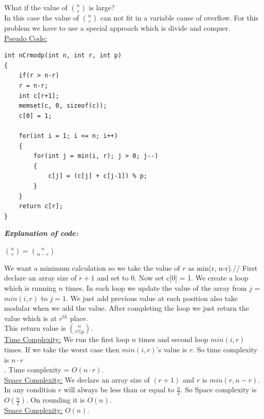 \documentclass[12pt]{book}
\begin{document}
What if the value of $n \choose r$ is large?\\

In this case the value of $n \choose r$ can not fit in a variable cause of overflow. For this problem we have to use a special approach which is divide and conquer.\\

\underline{Pseudo Code:}\\

\begin{lstlisting}
int nCrmodp(int n, int r, int p)
{
    if(r > n-r)
    r = n-r;
    int c[r+1];
    memset(c, 0, sizeof(c));
    c[0] = 1;

    for(int i = 1; i <= n; i++)
    {
        for(int j = min(i, r); j > 0; j--)
        {
            c[j] = (c[j] + c[j-1]) % p;
        }
    }
    return c[r];
}
\end{lstlisting}

\textbf{\textit{Explanation of code:}}\\
\begin{center}
$ {n \choose r} = {n \choose n - r} $\\
\end{center}

We want a minimum calculation so we take the value of $r$ as min(r, n-r).// 
First declare an array size of $r+1$ and set to 0. Now set c[0] = 1. We create a loop which is running $n$ times. In each loop we update the value of the array from $j$ = $min(i, r)$ to $j = 1$. We just add previous value at each position also take modular when we add the value. After completing the loop we just return the value which is at $r^{th}$ place.\\

This return value is $n \choose r \% p $.\\

\underline{Time Complexity:} 
We run the first loop $n$ times and second loop $min(i, r)$ times. If we take the worst case then $min(i, r)$’s value is $r$. So time complexity is $n \cdot r$\\.
Time complexity = $O(n \cdot r)$.\\

\underline{Space Complexity:}
We declare an array size of $(r+1)$ and $r$ is $min(r, n-r)$. In any condition $r$ will always be less than or equal to $\frac{n}{2}$. So Space complexity is $O(\frac{n}{2})$. On rounding it is $O(n)$.\\

\underline{Space Complexity:}
    $O(n)$.\\
\end{document}
